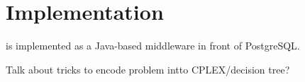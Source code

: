 \section{Implementation}

\sys is implemented as a Java-based middleware in front of PostgreSQL.

Talk about tricks to encode problem intto CPLEX/decision tree?


